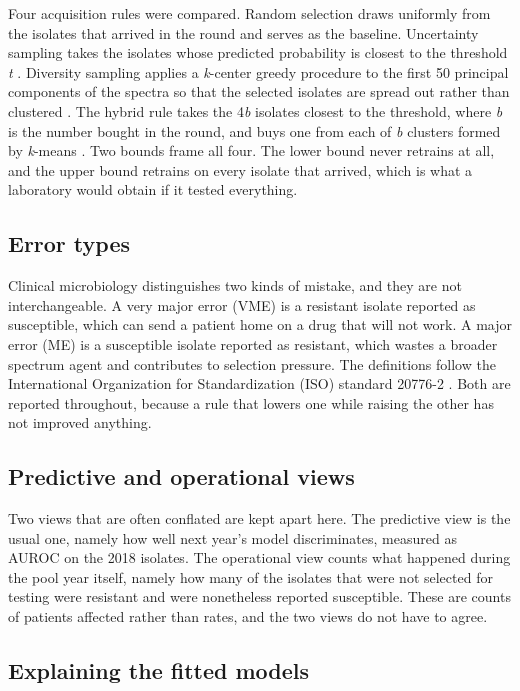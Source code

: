 \documentclass[conference,a4paper]{IEEEtran}
\begin{document}
Four acquisition rules were compared. Random selection draws uniformly from the isolates that arrived in the round and serves as the baseline. Uncertainty sampling takes the isolates whose predicted probability is closest to the threshold \textit{t} \cite{r10}. Diversity sampling applies a \textit{k}-center greedy procedure to the first 50 principal components of the spectra so that the selected isolates are spread out rather than clustered \cite{r11}. The hybrid rule takes the 4\textit{b} isolates closest to the threshold, where \textit{b} is the number bought in the round, and buys one from each of \textit{b} clusters formed by \textit{k}-means \cite{r14}. Two bounds frame all four. The lower bound never retrains at all, and the upper bound retrains on every isolate that arrived, which is what a laboratory would obtain if it tested everything.

\subsection{Error types}

Clinical microbiology distinguishes two kinds of mistake, and they are not interchangeable. A very major error (VME) is a resistant isolate reported as susceptible, which can send a patient home on a drug that will not work. A major error (ME) is a susceptible isolate reported as resistant, which wastes a broader spectrum agent and contributes to selection pressure. The definitions follow the International Organization for Standardization (ISO) standard 20776-2 \cite{r17}. Both are reported throughout, because a rule that lowers one while raising the other has not improved anything.

\subsection{Predictive and operational views}

Two views that are often conflated are kept apart here. The predictive view is the usual one, namely how well next year's model discriminates, measured as AUROC on the 2018 isolates. The operational view counts what happened during the pool year itself, namely how many of the isolates that were not selected for testing were resistant and were nonetheless reported susceptible. These are counts of patients affected rather than rates, and the two views do not have to agree.

\subsection{Explaining the fitted models}
\end{document}
